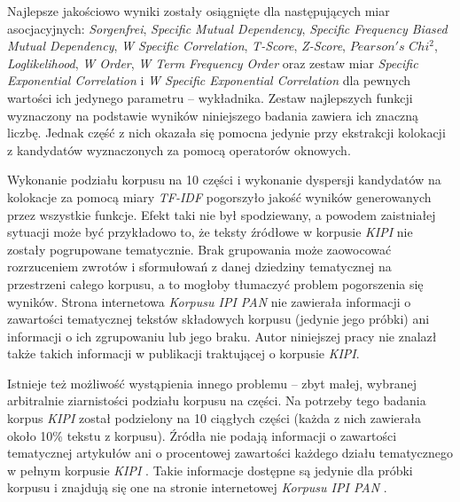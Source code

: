 Najlepsze jakościowo wyniki zostały osiągnięte dla następujących miar asocjacyjnych: \emph{Sorgenfrei}, \emph{Specific Mutual Dependency}, \emph{Specific Frequency Biased Mutual Dependency}, \emph{W Specific Correlation}, \emph{T-Score}, \emph{Z-Score}, $ Pearson's $ $ Chi^{2} $, \emph{Loglikelihood}, \emph{W Order}, \emph{W Term Frequency Order} oraz zestaw miar \emph{Specific Exponential Correlation} i \emph{W Specific Exponential Correlation} dla pewnych wartości ich jedynego parametru -- wykładnika.
Zestaw najlepszych funkcji wyznaczony na podstawie wyników niniejszego badania zawiera ich znaczną liczbę.
Jednak część z nich okazała się pomocna jedynie przy ekstrakcji kolokacji z kandydatów wyznaczonych za pomocą operatorów oknowych.

\par
Wykonanie podziału korpusu na 10 części i wykonanie dyspersji kandydatów na kolokacje za pomocą miary \emph{TF-IDF} pogorszyło jakość wyników generowanych przez wszystkie funkcje.
Efekt taki nie był spodziewany, a powodem zaistniałej sytuacji może być przykładowo to, że teksty źródłowe w korpusie \emph{KIPI} nie zostały pogrupowane tematycznie.
Brak grupowania może zaowocować rozrzuceniem zwrotów i sformułowań z danej dziedziny tematycznej na przestrzeni całego korpusu, a to mogłoby tłumaczyć problem pogorszenia się wyników.
Strona internetowa \emph{Korpusu IPI PAN} \cite{korpus_ipi_pan} nie zawierała informacji o zawartości tematycznej tekstów składowych korpusu (jedynie jego próbki) ani informacji o ich zgrupowaniu lub jego braku.
Autor niniejszej pracy nie znalazł także takich informacji w publikacji traktującej o korpusie \emph{KIPI}\cite{korpus_ipi_pan_publikacja}.

\par
Istnieje też możliwość wystąpienia innego problemu -- zbyt małej, wybranej arbitralnie ziarnistości podziału korpusu na części.
Na potrzeby tego badania korpus \emph{KIPI} został podzielony na 10 ciągłych części (każda z nich zawierała około 10\% tekstu z korpusu).
Źródła nie podają informacji o zawartości tematycznej artykułów ani o procentowej zawartości każdego działu tematycznego w pełnym korpusie \emph{KIPI} \cite{korpus_ipi_pan}\cite{korpus_ipi_pan_publikacja}.
Takie informacje dostępne są jedynie dla próbki korpusu i znajdują się one na stronie internetowej \emph{Korpusu IPI PAN} \cite{korpus_ipi_pan}.


